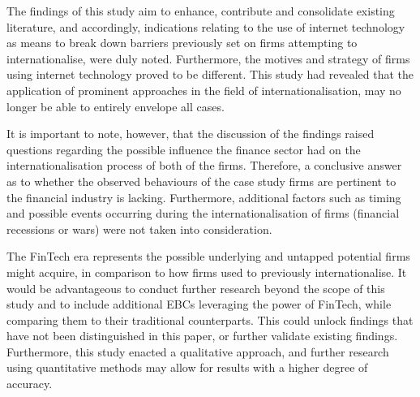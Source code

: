 \documentclass[11pt,a4paper]{article}
\begin{document}
{{{ \par
The findings of this study aim to enhance, contribute and consolidate existing literature, and accordingly, indications relating to the use of internet technology as means to break down barriers previously set on firms attempting to internationalise, were duly noted. Furthermore, the motives and strategy of firms using internet technology proved to be different. This study had revealed that the application of prominent approaches in the field of internationalisation, may no longer be able to entirely envelope all cases. \par
It is important to note, however, that the discussion of the findings raised questions regarding the possible influence the finance sector had on the internationalisation process of both of the firms. Therefore, a conclusive answer as to whether the observed behaviours of the case study firms are pertinent to the financial industry is lacking. Furthermore, additional factors such as timing and possible events occurring during the internationalisation of firms (financial recessions or wars) were not taken into consideration. \par
The FinTech era represents the possible underlying and untapped potential firms might acquire, in comparison to how firms used to previously internationalise. It would be advantageous to conduct further research beyond the scope of this study and to include additional EBCs leveraging the power of FinTech, while comparing them to their traditional counterparts. This could unlock findings that have not been distinguished in this paper, or further validate existing findings. Furthermore, this study enacted a qualitative approach, and further research using quantitative methods may allow for results with a higher degree of accuracy.






}}}
\end{document}
